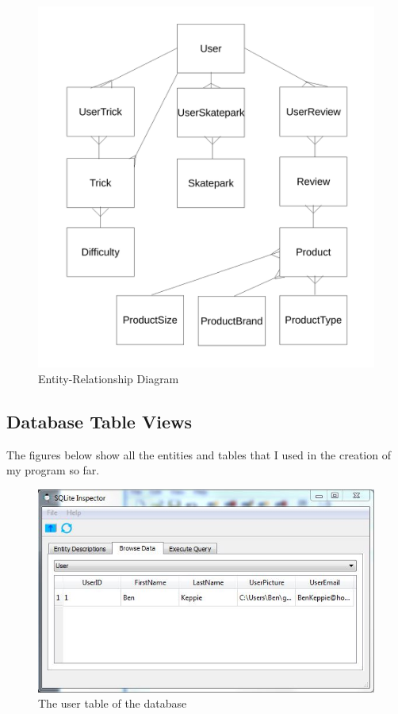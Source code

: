 \begin{figure}[H]
    \includegraphics[width=\textwidth]{./Design/EntityRelationships2.pdf}
    \caption{Entity-Relationship Diagram} \label{fig:Entity Diagram2}
\end{figure}







\subsection{Database Table Views}

The figures below show all the entities and tables that I used in the creation of my program so far.

\begin{figure}[H]
    \includegraphics[width=\textwidth]{./Maintenance/Figures/UserTable.jpg}
    \caption{The user table of the database} \label{fig:User Table}
\end{figure}

